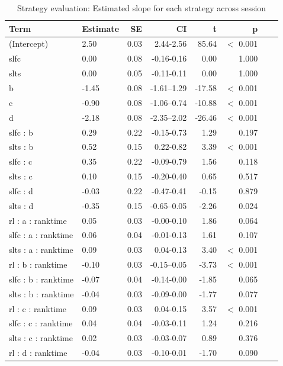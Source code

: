 \documentclass[pdflatex,sn-nature]{sn-jnl}%
\theoremstyle{thmstyleone}%
\theoremstyle{thmstyletwo}%
\theoremstyle{thmstylethree}%
\begin{document}
\begin{appendices}
\begin{table}[p]
\caption{Strategy evaluation: Estimated slope for each strategy across session}\label{table_strategyevaluation_slopestrategy}
\centering
\begin{tabular}{llrrrrrr}
  \hline
 Term & Estimate & SE & CI & t & p \\ 
  \hline
(Intercept) & 2.50 & 0.03 & 2.44-2.56 & 85.64 &  $<$  0.001 \\ 
  slfc & 0.00 & 0.08 & -0.16-0.16 & 0.00 &    1.000 \\ 
  slts & 0.00 & 0.05 & -0.11-0.11 & 0.00 &    1.000 \\ 
  b & -1.45 & 0.08 & -1.61--1.29 & -17.58 &  $<$  0.001 \\ 
  c & -0.90 & 0.08 & -1.06--0.74 & -10.88 &  $<$  0.001 \\ 
  d & -2.18 & 0.08 & -2.35--2.02 & -26.46 &  $<$  0.001 \\ 
  slfc : b & 0.29 & 0.22 & -0.15-0.73 & 1.29 &    0.197 \\ 
  slts : b & 0.52 & 0.15 & 0.22-0.82 & 3.39 &  $<$  0.001 \\ 
  slfc : c & 0.35 & 0.22 & -0.09-0.79 & 1.56 &    0.118 \\ 
  slts : c & 0.10 & 0.15 & -0.20-0.40 & 0.65 &    0.517 \\ 
  slfc : d & -0.03 & 0.22 & -0.47-0.41 & -0.15 &    0.879 \\ 
  slts : d & -0.35 & 0.15 & -0.65--0.05 & -2.26 &    0.024 \\ 
rl : a : ranktime & 0.05 & 0.03 & -0.00-0.10 & 1.86 &    0.064 \\ 
slfc : a : ranktime & 0.06 & 0.04 & -0.01-0.13 & 1.61 &    0.107 \\ 
slts : a : ranktime & 0.09 & 0.03 & 0.04-0.13 & 3.40 &  $<$  0.001 \\ 
rl : b : ranktime & -0.10 & 0.03 & -0.15--0.05 & -3.73 &  $<$  0.001 \\ 
slfc : b : ranktime & -0.07 & 0.04 & -0.14-0.00 & -1.85 &    0.065 \\ 
slts : b : ranktime & -0.04 & 0.03 & -0.09-0.00 & -1.77 &    0.077 \\ 
rl : c : ranktime & 0.09 & 0.03 & 0.04-0.15 & 3.57 &  $<$  0.001 \\ 
slfc : c : ranktime & 0.04 & 0.04 & -0.03-0.11 & 1.24 &    0.216 \\ 
slts : c : ranktime & 0.02 & 0.03 & -0.03-0.07 & 0.89 &    0.376 \\ 
rl : d : ranktime & -0.04 & 0.03 & -0.10-0.01 & -1.70 &    0.090 \\ 

\end{tabular}
\end{table}
\end{appendices}
\end{document}
